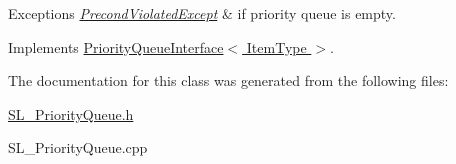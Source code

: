 \begin{DoxyExceptions}{Exceptions}
{\em \hyperlink{class_precond_violated_except}{Precond\+Violated\+Except}} & if priority queue is empty. \\
\hline
\end{DoxyExceptions}


Implements \hyperlink{class_priority_queue_interface_aa0e45d144ef82101311ab83501dd403b}{Priority\+Queue\+Interface$<$ Item\+Type $>$}.



The documentation for this class was generated from the following files\+:\begin{DoxyCompactItemize}
\item 
\hyperlink{_s_l___priority_queue_8h}{S\+L\+\_\+\+Priority\+Queue.\+h}\item 
S\+L\+\_\+\+Priority\+Queue.\+cpp\end{DoxyCompactItemize}
